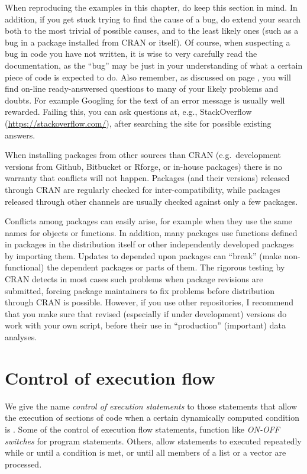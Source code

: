 \documentclass[krantz2]{krantz}\usepackage{knitr}%
\begin{document}
When reproducing the examples in this chapter, do keep this section in mind. In addition, if you get stuck trying to find the cause of a bug, do extend your search both to the most trivial of possible causes, and to the least likely ones (such as a bug in a package installed from CRAN or \Rlang itself). Of course, when suspecting a bug in code you have not written, it is wise to very carefully read the documentation, as the ``bug'' may be just in your understanding of what a certain piece of code is expected to do.  Also remember, as discussed on page \pageref{sec:getting:help}, you will find on-line ready-answersed questions to many of your likely problems and doubts. For example Googling for the text of an error message is usually well rewarded. Failing this, you can ask questions at, e.g., StackOverflow (\url{https://stackoverflow.com/}), after searching the site for possible existing answers.

\begin{warningbox}
When installing packages from other sources than CRAN (e.g.\ development versions from Github, Bitbucket or Rforge, or in-house packages) there is no warranty that conflicts will not happen. Packages (and their versions) released through CRAN are regularly checked for inter-compatibility, while packages released through other channels are usually checked against only a few packages.

Conflicts among packages can easily arise, for example when they use the same names for objects or functions. In addition, many packages use functions defined in packages in the \Rlang distribution itself or other independently developed packages by importing them. Updates to depended upon packages can ``break'' (make non-functional) the dependent packages or parts of them. The rigorous testing by CRAN detects in most cases such problems when package revisions are submitted, forcing package maintainers to fix problems before distribution through CRAN is possible. However, if you use other repositories, I recommend that you make sure that revised (especially if under development) versions do work with your own script, before their use in ``production'' (important) data analyses.
\end{warningbox}


\section{Control of execution flow}\label{sec:script:flow:control}
We give the name \emph{control of execution statements} to those statements that allow the execution of sections of code when a certain dynamically computed condition is . Some of the control of execution flow statements, function like \emph{ON-OFF switches} for program statements. Others, allow statements to executed repeatedly while or until a condition is met, or until all members of a list or a vector are processed.
\end{document}
